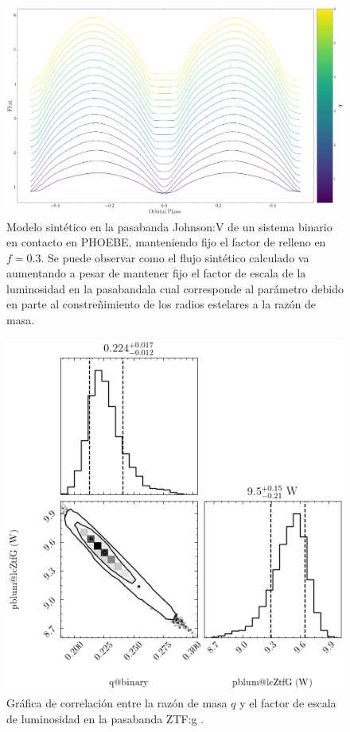 \begin{figure}[!ht]
    \centering
    \includegraphics[scale=0.4]{Conclusion/Figures/Figura q-Luminosidad Relacion.png}
    \caption{Modelo sintético en la pasabanda Johnson:V de un sistema binario en
    contacto en PHOEBE, manteniendo fijo el factor de relleno en $f = 0.3$. Se
    puede observar como el flujo sintético calculado va aumentando a pesar de
    mantener fijo el factor de escala de la luminosidad en la
    pasabanda\textemdash la cual corresponde al parámetro
    \textemdash debido en parte al constreñimiento de los radios
    estelares a la razón de masa.}
    \label{figuraRazonMasaLuminosidadSintetico}
\end{figure}

\begin{figure}[!ht]
    \centering
    \includegraphics[scale=0.8]{Conclusion/Figures/Figura q-Luminosidad PDF Correlacion.png}
    \caption{Gráfica de correlación entre la razón de masa $q$ y el factor de
    escala de luminosidad en la pasabanda ZTF:g .}
    \label{figuraQ_LuminosidadPdfCorrelacion}
\end{figure}

